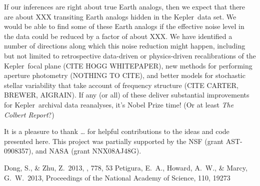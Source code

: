 \documentclass[12pt,preprint]{aastex}
\newcommand{\project}[1]{{\sffamily #1}}
\newcommand{\kepler}{\project{Kepler}}
\newcommand{\foreign}[1]{\emph{#1}}
\newcommand{\etal}{\foreign{et\,al.}}
\begin{document}
If our inferences are right about true Earth analogs, then we expect that
there are about XXX transiting Earth analogs hidden in the \kepler\ data set.
We would be able to find some of these Earth analogs if the effective noise
level in the data could be reduced by a factor of about XXX.
We have identified a number of directions along which this noise reduction
might happen, including but not limited to retrospective data-driven or
physics-driven recalibrations of the \kepler\ focal plane (CITE HOGG
WHITEPAPER), new methods for performing aperture photometry (NOTHING TO CITE),
and better models for stochastic stellar variability that take account of
frequency structure (CITE CARTER, BREWER, AIGRAIN).
If any (or all) of these deliver substantial improvements for \kepler\
archival data reanalyses, it's Nobel Prize time!  (Or at least \textsl{The
Colbert Report}?)

\acknowledgments
It is a pleasure to thank
    \ldots
for helpful contributions to the ideas and code presented here.
This project was partially supported by the NSF (grant AST-0908357), and NASA
(grant NNX08AJ48G).

\newcommand{\arxiv}[1]{\href{http://arxiv.org/abs/#1}{arXiv:#1}}
\begin{thebibliography}{}\raggedright
{}
Dong, S., \& Zhu, Z.\ 2013, \apj, 778, 53 
\bibitem[Petigura \etal(2013)]{petigura}
Petigura, E.~A., Howard, A.~W., \& Marcy, G.~W.\ 2013,
Proceedings of the National Academy of Science, 110, 19273
\end{thebibliography}
\end{document}
